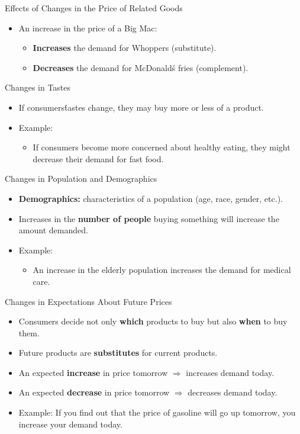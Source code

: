 \documentclass[aspectratio=169]{beamer}
\begin{document}
\begin{frame}{Effects of Changes in the Price of Related Goods}
\transfade
\begin{itemize}
  \item An increase in the price of a Big Mac:
  \begin{itemize}
    \item \textbf{Increases} the demand for Whoppers (substitute).
    \item \textbf{Decreases} the demand for McDonald\'s fries (complement).
  \end{itemize}
\end{itemize}
\end{frame}

\begin{frame}{Changes in Tastes}
\transfade
\begin{itemize}
  \item If consumers\' tastes change, they may buy more or less of a product.
  \item Example:
  \begin{itemize}
    \item If consumers become more concerned about healthy eating, they might decrease their demand for fast food.
  \end{itemize}
\end{itemize}
\end{frame}

\begin{frame}{Changes in Population and Demographics}
\transfade
\begin{itemize}
  \item \textbf{Demographics:} characteristics of a population (age, race, gender, etc.).
  \item Increases in the \textbf{number of people} buying something will increase the amount demanded.
  \item Example:
  \begin{itemize}
    \item An increase in the elderly population increases the demand for medical care.
  \end{itemize}
\end{itemize}
\end{frame}

\begin{frame}{Changes in Expectations About Future Prices}
\transfade
\begin{itemize}
  \item Consumers decide not only \textbf{which} products to buy but also \textbf{when} to buy them.
  \item Future products are \textbf{substitutes} for current products.
  \item An expected \textbf{increase} in price tomorrow \(\Rightarrow\) increases demand today.
  \item An expected \textbf{decrease} in price tomorrow \(\Rightarrow\) decreases demand today.
  \item Example: If you find out that the price of gasoline will go up tomorrow, you increase your demand today.
\end{itemize}
\end{frame}
\end{document}
